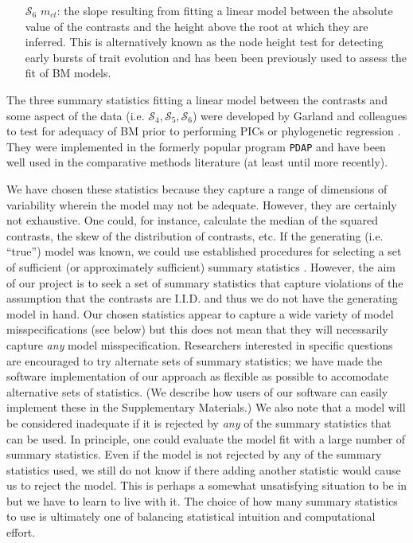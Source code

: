 \documentclass[12pt]{article}
\begin{document}
\begin{enumerate}
\item[$\mathcal{S}_6$] $m_{ct}$: the slope resulting from fitting a linear model between the absolute value of the contrasts and the height above the root at which they are inferred. This is alternatively known as the node height test \citep{FreckletonHarvey2006, SlaterPennell} for detecting early bursts of trait evolution and has been been previously used to assess the fit of BM models.
\end{enumerate}

The three summary statistics fitting a linear model between the contrasts and some aspect of the data (i.e. $\mathcal{S}_4, \mathcal{S}_5, \mathcal{S}_6$) were developed by Garland and colleagues \citep{Garland1992, Garland1993,  Diaz1996} to test for adequacy of BM prior to performing PICs \citep{Felsenstein1985} or phylogenetic regression \citep{Grafen1989}. They were implemented in the formerly popular program \texttt{PDAP} \citep{GarlandPDAP, Midford2005} and have been well used in the comparative methods literature (at least until more recently).

We have chosen these statistics because they capture a range of dimensions of variability wherein the model may not be adequate. However, they are certainly not exhaustive. One could, for instance, calculate the median of the squared contrasts, the skew of the distribution of contrasts, etc. If the generating (i.e. ``true'') model was known, we could use established procedures for selecting a set of sufficient (or approximately sufficient) summary statistics \citep[e.g.][]{MajoramJoyce, Wegmann2010}. However, the aim of our project is to seek a set of summary statistics that capture violations of the assumption that the contrasts are I.I.D. and thus we do not have the generating model in hand. Our chosen statistics appear to capture a wide variety of model misspecifications (see below) but this does not mean that they will necessarily capture \textit{any} model misspecification. Researchers interested in specific questions are encouraged to try alternate sets of summary statistics; we have made the software implementation of our approach as flexible as possible to accomodate alternative sets of statistics. (We describe how users of our software can easily implement these in the Supplementary Materials.) We also note that a model will be considered inadequate if it is rejected by \textit{any} of the summary statistics that can be used. In principle, one could evaluate the model fit with a large number of summary statistics. Even if the model is not rejected by any of the summary statistics used, we still do not know if there adding another statistic would cause us to reject the model. This is perhaps a somewhat unsatisfying situation to be in but we have to learn to live with it. The choice of how many summary statistics to use is ultimately one of balancing statistical intuition and computational effort.
\end{document}
